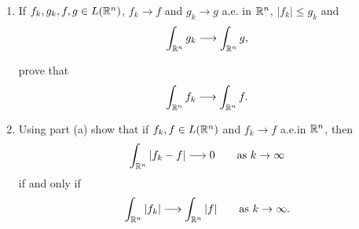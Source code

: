 \begin{problem}
\begin{enumerate}[label=(\alph*)]
\item If \(f_k,g_k,f,g\in L(\mathbb{R}^n)\), \(f_k\to f\) and \(g_k\to g\) a.e.\@
  in \(\mathbb{R}^n\), \(|f_k|\leq g_k\) and
  \[
    \int_{\mathbb{R}^n}g_k\longrightarrow\int_{\mathbb{R}^n}g,
  \]

  prove that
  \[
    \int_{\mathbb{R}^n} f_k\longrightarrow\int_{\mathbb{R}^n}f.
  \]
\item Using part (a) show that if \(f_k,f\in L(\mathbb{R}^n)\) and \(f_k\to f\)
  a.e.\@ in \(\mathbb{R}^n\), then
  \[
    \int_{\mathbb{R}^n}|f_k-f|\longrightarrow 0\qquad\text{as \(k\to\infty\)}
  \]
  if and only if
  \[
    \int_{\mathbb{R}^n}|f_k|\longrightarrow\int_{\mathbb{R}^n}|f|\qquad\text{as
      \(k\to\infty\)}.
  \]
\end{enumerate}
\end{problem}
